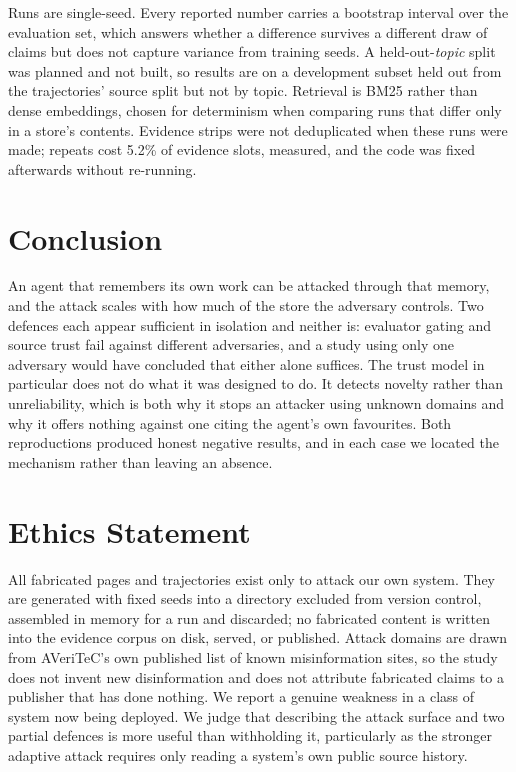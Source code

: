 \documentclass[journal]{IEEEtran}
\begin{document}
Runs are single-seed. Every reported number carries a bootstrap interval over the
evaluation set, which answers whether a difference survives a different draw of
claims but does not capture variance from training seeds. A held-out-\emph{topic}
split was planned and not built, so results are on a development subset held out
from the trajectories' source split but not by topic. Retrieval is BM25 rather
than dense embeddings, chosen for determinism when comparing runs that differ
only in a store's contents. Evidence strips were not deduplicated when these runs
were made; repeats cost 5.2\% of evidence slots, measured, and the code was fixed
afterwards without re-running.

\section{Conclusion}
An agent that remembers its own work can be attacked through that memory, and the
attack scales with how much of the store the adversary controls. Two defences
each appear sufficient in isolation and neither is: evaluator gating and source
trust fail against different adversaries, and a study using only one adversary
would have concluded that either alone suffices. The trust model in particular
does not do what it was designed to do. It detects novelty rather than
unreliability, which is both why it stops an attacker using unknown domains and
why it offers nothing against one citing the agent's own favourites. Both
reproductions produced honest negative results, and in each case we located the
mechanism rather than leaving an absence.

\section*{Ethics Statement}
All fabricated pages and trajectories exist only to attack our own system. They
are generated with fixed seeds into a directory excluded from version control,
assembled in memory for a run and discarded; no fabricated content is written
into the evidence corpus on disk, served, or published. Attack domains are drawn
from AVeriTeC's own published list of known misinformation sites, so the study
does not invent new disinformation and does not attribute fabricated claims to a
publisher that has done nothing. We report a genuine weakness in a class of
system now being deployed. We judge that describing the attack surface and two
partial defences is more useful than withholding it, particularly as the stronger
adaptive attack requires only reading a system's own public source history.
\end{document}
